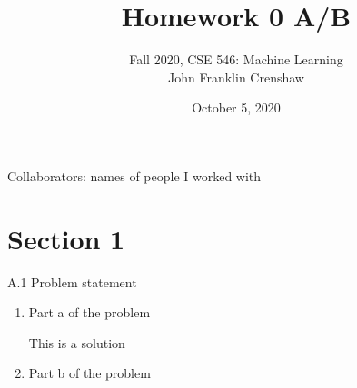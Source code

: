 \documentclass{article}
\date{\normalsize{October 5, 2020}}
\newenvironment{solution}{\begin{adjustwidth}{8mm}{}}{\end{adjustwidth}}
\begin{document}
\title{Homework 0 A/B}
\author{\normalsize{Fall 2020, CSE 546: Machine Learning} \\ 
        \normalsize{John Franklin Crenshaw}}
\maketitle

Collaborators: names of people I worked with

\section*{Section 1}

A.1 Problem statement
\begin{enumerate}
        \item Part a of the problem
                \begin{solution}
                        This is a solution
                \end{solution}
        \item Part b of the problem
\end{enumerate}
\end{document}
